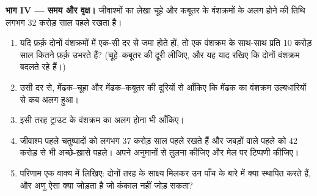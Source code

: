 \begin{problem}
\medskip
\noindent\textbf{भाग IV --- समय और वृक्ष।}
जीवाश्मों का लेखा चूहे और कबूतर के वंशक्रमों के अलग होने की तिथि लगभग
32 करोड़ साल पहले रखता है।
\begin{enumerate}[resume]
  \item यदि फ़र्क़ दोनों वंशक्रमों में एक-सी दर से जमा होते हों, तो एक
        वंशक्रम के साथ-साथ प्रति 10 करोड़ साल कितने फ़र्क़ उभरते हैं?
        (चूहे--कबूतर की दूरी लीजिए, और यह याद रखिए कि दोनों वंशक्रम
        बदलते रहे हैं।)
  \item उसी दर से, मेंढक--चूहा और मेंढक--कबूतर की दूरियों से आँकिए कि
        मेंढक का वंशक्रम उल्बधारियों से कब अलग हुआ।
  \item इसी तरह ट्राउट के वंशक्रम का अलग होना भी आँकिए।
  \item जीवाश्म पहले चतुष्पादों को लगभग 37 करोड़ साल पहले रखते हैं और
        जबड़ों वाले पहले  को 42 करोड़ से भी अच्छे-ख़ासे पहले।
        अपने अनुमानों से तुलना कीजिए और मेल पर टिप्पणी कीजिए।
  \item परिणाम एक वाक्य में लिखिए: दोनों तरह के साक्ष्य मिलकर उन पाँच
         के बारे में क्या स्थापित करते हैं, और अणु ऐसा क्या
        जोड़ता है जो कंकाल नहीं जोड़ सकता?
\end{enumerate}
\end{problem}
